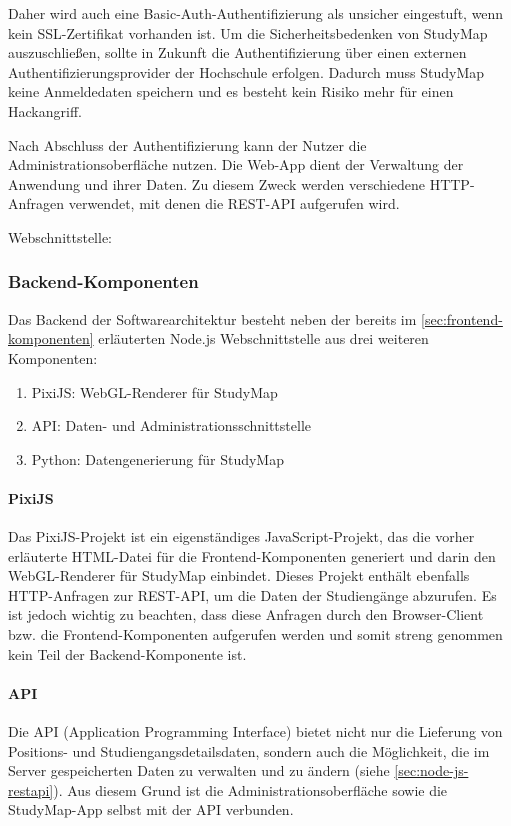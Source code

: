 Daher wird auch eine Basic-Auth-Authentifizierung als unsicher eingestuft, wenn kein SSL-Zertifikat vorhanden ist. Um die Sicherheitsbedenken von StudyMap auszuschließen, sollte in Zukunft die Authentifizierung über einen externen Authentifizierungsprovider der Hochschule erfolgen. Dadurch muss StudyMap keine Anmeldedaten speichern und es besteht kein Risiko mehr für einen Hackangriff.

Nach Abschluss der Authentifizierung kann der Nutzer die Administrationsoberfläche nutzen. Die Web-App dient der Verwaltung der Anwendung und ihrer Daten. Zu diesem Zweck werden verschiedene HTTP-Anfragen verwendet, mit denen die REST-API aufgerufen wird.

\noindent
Webschnittstelle: 

\subsubsection{Backend-Komponenten}
Das Backend der Softwarearchitektur besteht neben der bereits im \autoref{sec:frontend-komponenten} erläuterten Node.js Webschnittstelle aus drei weiteren Komponenten: \begin{enumerate}
    \item PixiJS: WebGL-Renderer für StudyMap
    \item API: Daten- und Administrationsschnittstelle
    \item Python: Datengenerierung für StudyMap
\end{enumerate}

\paragraph*{PixiJS}
Das PixiJS-Projekt ist ein eigenständiges JavaScript-Projekt, das die vorher erläuterte HTML-Datei  für die Frontend-Komponenten generiert und darin den WebGL-Renderer für StudyMap einbindet. Dieses Projekt enthält ebenfalls HTTP-Anfragen zur REST-API, um die Daten der Studiengänge abzurufen. Es ist jedoch wichtig zu beachten, dass diese Anfragen durch den Browser-Client bzw. die Frontend-Komponenten aufgerufen werden und somit streng genommen kein Teil der Backend-Komponente ist.

\paragraph*{API}
Die API (Application Programming Interface) bietet nicht nur die Lieferung von Positions- und Studiengangsdetailsdaten, sondern auch die Möglichkeit, die im Server gespeicherten Daten zu verwalten und zu ändern (siehe \autoref{sec:node-js-restapi}). Aus diesem Grund ist die Administrationsoberfläche sowie die StudyMap-App selbst mit der API verbunden.

